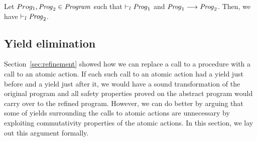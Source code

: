 \begin{lemma}
Let $Prog_1, \mathit{Prog}_2 \in \mathit{Program}$ such that $\vdash_l \mathit{Prog}_1$ and $\mathit{Prog}_1 \longrightarrow \mathit{Prog}_2$.
Then, we have $\vdash_l \mathit{Prog}_2$.
\end{lemma}

\subsection{Yield elimination}
\label{sec:yield-elimination}

Section~\ref{sec:refinement} showed how we can replace a call to a procedure with 
a call to an atomic action.
If each such call to an atomic action had a yield just before and a yield just after it,
we would have a sound transformation of the original program and all safety properties proved
on the abstract program would carry over to the refined program.
However, we can do better by arguing that some of yields surrounding the calls to atomic actions 
are unnecessary by exploiting commutativity properties of the atomic actions.
In this section, we lay out this argument formally.

